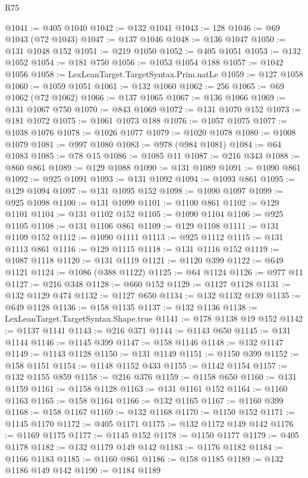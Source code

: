\begin{lexlean}{R75}
\begin{coremodule}
@1041 := @405 @1040
@1042 := @132 @1041
@1043 := 128
@1046 := @69 @1043 (@72 @1043)
@1047 := @137 @1046
@1048 := @136 @1047
@1050 := @131 @1048 @152
@1051 := @219 @1050
@1052 := @405 @1051
@1053 := @132 @1052
@1054 := @181 @750
@1056 := @1053 @1054 @188
@1057 := @1042 @1056
@1058 := LexLeanTarget.TargetSyntax.Prim.natLe
@1059 := @127 @1058
@1060 := @1059 @1051
@1061 := @132 @1060
@1062 := 256
@1065 := @69 @1062 (@72 @1062)
@1066 := @137 @1065
@1067 := @136 @1066
@1069 := @131 @1067 @750
@1070 := @843 @1069
@1072 := @131 @1070 @152
@1073 := @181 @1072
@1075 := @1061 @1073 @188
@1076 := @1057 @1075
@1077 := @1038 @1076
@1078 := @1026 @1077
@1079 := @1020 @1078
@1080 := @1008 @1079
@1081 := @997 @1080
@1083 := @978 (@984 @1081)
@1084 := @64 @1083
@1085 := @78 @15
@1086 := @1085 @11
@1087 := @216 @343
@1088 := @860 @861
@1089 := @129 @1088
@1090 := @131 @1089
@1091 := @1090 @861
@1092 := @925 @1091
@1093 := @131 @1092
@1094 := @1093 @861
@1095 := @129 @1094
@1097 := @131 @1095 @152
@1098 := @1090 @1097
@1099 := @925 @1098
@1100 := @131 @1099
@1101 := @1100 @861
@1102 := @129 @1101
@1104 := @131 @1102 @152
@1105 := @1090 @1104
@1106 := @925 @1105
@1108 := @131 @1106 @861
@1109 := @129 @1108
@1111 := @131 @1109 @152
@1112 := @1090 @1111
@1113 := @925 @1112
@1115 := @131 @1113 @861
@1116 := @129 @1115
@1118 := @131 @1116 @152
@1119 := @1087 @1118
@1120 := @131 @1119
@1121 := @1120 @399
@1122 := @649 @1121
@1124 := @1086 (@388 @1122)
@1125 := @64 @1124
@1126 := @977 @11
@1127 := @216 @348
@1128 := @660 @152
@1129 := @1127 @1128
@1131 := @132 @1129 @474
@1132 := @1127 @650
@1134 := @132 @1132 @139
@1135 := @649 @1128
@1136 := @158 @1135
@1137 := @132 @1136
@1138 := LexLeanTarget.TargetSyntax.Shape.true
@1141 := @178 @1138 @19 @152
@1142 := @1137 @1141
@1143 := @216 @371
@1144 := @1143 @650
@1145 := @131 @1144
@1146 := @1145 @399
@1147 := @158 @1146
@1148 := @132 @1147
@1149 := @1143 @1128
@1150 := @131 @1149
@1151 := @1150 @399
@1152 := @158 @1151
@1154 := @1148 @1152 @433
@1155 := @1142 @1154
@1157 := @132 @1155 @859
@1158 := @216 @376
@1159 := @1158 @650
@1160 := @131 @1159
@1161 := @1158 @1128
@1163 := @131 @1161 @152
@1164 := @1160 @1163
@1165 := @158 @1164
@1166 := @132 @1165
@1167 := @1160 @399
@1168 := @158 @1167
@1169 := @132 @1168
@1170 := @1150 @152
@1171 := @1145 @1170
@1172 := @405 @1171
@1175 := @132 @1172 @149 @142
@1176 := @1169 @1175
@1177 := @1145 @152
@1178 := @1150 @1177
@1179 := @405 @1178
@1182 := @132 @1179 @149 @142
@1183 := @1176 @1182
@1184 := @1166 @1183
@1185 := @1160 @861
@1186 := @158 @1185
@1189 := @132 @1186 @149 @142
@1190 := @1184 @1189

\end{coremodule}
\end{lexlean}

